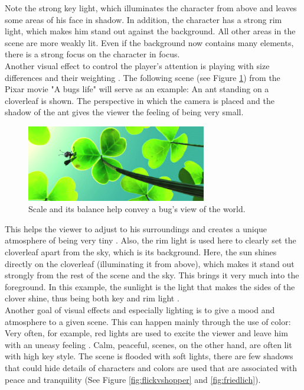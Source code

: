 Note the strong key light, which illuminates the character from above and leaves some areas of his face in shadow. In addition, the character has a strong rim light, which makes him stand out against the background. All other areas in the scene are more weakly lit. Even if the background now contains many elements, there is a strong focus on the character in focus.\\

Another visual effect to control the player's attention is playing with size differences and their weighting \cite{sudeep}. The following scene (see Figure \ref{fig:klee}) from the Pixar movie "A bugs life" will serve as an example: An ant standing on a cloverleaf is shown. The perspective in which the camera is placed and the shadow of the ant gives the viewer the feeling of being very small. 

\begin{figure}[H]
	\centering
		\includegraphics[width=0.7\textwidth]{Bilder/klee.PNG}
	\caption{Scale and its balance help convey a bug’s view of the world. \cite{bugslife}}
	\label{fig:klee}
\end{figure}

This helps the viewer to adjust to his surroundings and creates a unique atmosphere of being very tiny \cite{sudeep}. Also, the rim light is used here to clearly set the cloverleaf apart from the sky, which is its background. Here, the sun shines directly on the cloverleaf (illuminating it from above), which makes it stand out strongly from the rest of the scene and the sky. This brings it very much into the foreground. In this example, the sunlight is the light that makes the sides of the clover shine, thus being both key and rim light \cite{sudeep}.\\

Another goal of visual effects and especially lighting is to give a mood and atmosphere to a given scene. This can happen mainly through the use of color: Very often, for example, red lights are used to excite the viewer and leave him with an uneasy feeling \cite{Shadowplay}. Calm, peaceful, scenes, on the other hand, are often lit with high key style. The scene is flooded with soft lights, there are few shadows that could hide details of characters and colors are used that are associated with peace and tranquility \cite{sudeep} (See Figure \ref{fig:flickvshopper} and \ref{fig:friedlich}).

